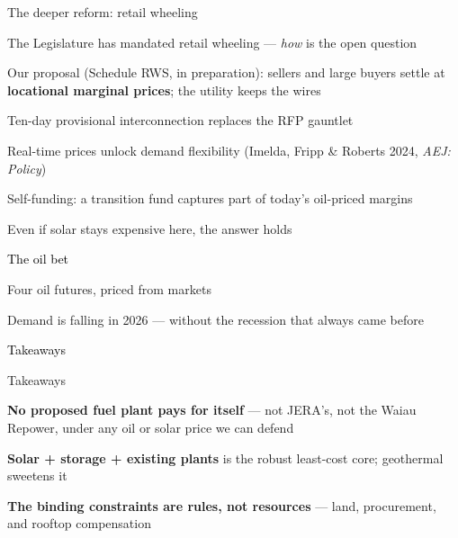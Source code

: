 \documentclass[11pt,aspectratio=169]{beamer}
\begin{document}
\begin{frame}{The deeper reform: retail wheeling}
\begin{wideitemize}
  \item The Legislature has mandated retail wheeling --- \emph{how} is
        the open question
  \item Our proposal (Schedule RWS, in preparation): sellers and large
        buyers settle at \textbf{locational marginal prices}; the
        utility keeps the wires
  \item Ten-day provisional interconnection replaces the RFP gauntlet
  \item Real-time prices unlock demand flexibility
        (Imelda, Fripp \& Roberts 2024, \emph{AEJ: Policy})
  \item Self-funding: a transition fund captures part of today's
        oil-priced margins
\end{wideitemize}
\end{frame}

\begin{frame}{Even if solar stays expensive here, the answer holds}
\end{frame}

\begin{transitionframe}
  \begin{center}{\Huge \textcolor{black}{The oil bet}}\end{center}
\end{transitionframe}

\begin{frame}{Four oil futures, priced from markets}
\end{frame}

\begin{frame}{Demand is falling in 2026 --- without the recession that
  always came before}
\end{frame}

\begin{transitionframe}
  \begin{center}{\Huge \textcolor{black}{Takeaways}}\end{center}
\end{transitionframe}

\begin{frame}{Takeaways}
\begin{wideitemize}
  \item \textbf{No proposed fuel plant pays for itself} --- not JERA's,
        not the Waiau Repower, under any oil or solar price we can defend
  \item \textbf{Solar + storage + existing plants} is the robust
        least-cost core; geothermal sweetens it
  \item \textbf{The binding constraints are rules, not resources} ---
        land, procurement, and rooftop compensation
\end{wideitemize}
\end{frame}
\end{document}
